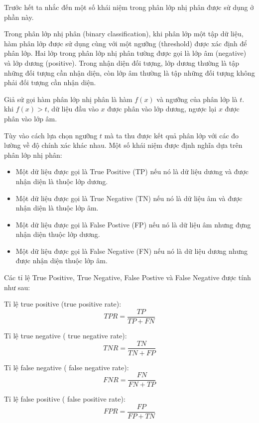 \documentclass[14pt, oneside, a4paper, openany]{scrartcl}
\begin{document}
Trước hết ta nhắc đến một số khái niệm trong phân lớp nhị phân được sử dụng ở phần này.

Trong phân lớp nhị phân (binary classification), khi phân lớp một tập dữ liệu, hàm phân lớp được sử dụng cùng với một ngưỡng (threshold) được xác định để phân lớp. Hai lớp trong phân lớp nhị phân tường được gọi là lớp âm (negative) và lớp dương (positive). Trong nhận diện đối tượng, lớp dương thường là tập những đối tượng cần nhận diện, còn lớp âm thường là tập những đối tượng không phải đối tượng cần nhận diện.

Giả sử gọi hàm phân lớp nhị phân là hàm $f(x)$ và ngưỡng của phân lớp là $t$. khi $f(x) > t$, dữ liệu đầu vào $x$ được phân vào lớp dương, ngược lại $x$ được phân vào lớp âm.

Tùy vào cách lựa chọn ngưỡng $t$ mà ta thu được kết quả phân lớp với các đo lường về độ chính xác khác nhau. Một số khái niệm được định nghĩa dựa trên phân lớp nhị phân:
\begin{itemize}
	\item Một dữ liệu được gọi là True Positive (TP) nếu nó là dữ liệu dương và được nhận diện là thuộc lớp dương.
	\item Một dữ liệu được gọi là True Negative (TN) nếu nó là dữ liệu âm và được nhận diện là thuộc lớp âm.
	\item Một dữ liệu được gọi là False Postive (FP) nếu nó là dữ liệu âm nhưng đựng nhận diện thuộc lớp dương.
	\item Một dữ liệu được gọi là False Negative (FN) nếu nó là dữ liệu dương nhưng được nhận diện thuộc lớp âm.
\end{itemize}
Các tỉ lệ True Positive, True Negative, False Postive và False Negative được tính như sau:

Tỉ lệ true positive (true positive rate):
\begin{equation}
	 TPR = \frac{TP}{TP + FN}
\end{equation}

Tỉ lệ true negative ( true negative rate):
\begin{equation}
	TNR = \frac{TN}{TN + FP}
\end{equation}

Tỉ lệ false negative ( false negative rate):
\begin{equation}
FNR = \frac{FN}{FN + TP}
\end{equation}

Tỉ lệ false positive ( false positive rate):
\begin{equation}
FPR = \frac{FP}{FP + TN}
\end{equation}
\end{document}
